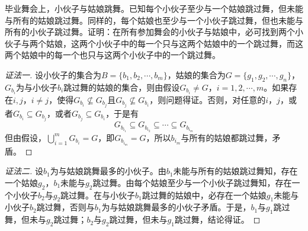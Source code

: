 \documentclass{article}
\begin{document}
\begin{CJK}{UTF8}{gbsn}
\begin{Exercise}
  毕业舞会上，小伙子与姑娘跳舞。已知每个小伙子至少与一个姑娘跳过舞，但未能与所有的姑娘跳过舞。同样的，每个姑娘也至少与一个小伙子跳过舞，但也未能与所有的小伙子跳过舞。证明：在所有参加舞会的小伙子与姑娘中，必可找到两个小伙子与两个姑娘，这两个小伙子中的每一个只与这两个姑娘中的一个跳过舞，而这两个姑娘中的每一个也只与这两个小伙子中的一个跳过舞。
\end{Exercise}
\begin{proof}[证法一]设小伙子的集合为$B=\{b_1,b_2,\cdots,b_m\}$，姑娘的集合为$G=\{g_1,g_2,\cdots,g_n\}$， $G_{b_i}$为与小伙子$b_i$跳过舞的姑娘的集合，则由假设$G_{b_i}\neq G$，$i=1,2,\cdots,m$。如果存在$i, j$，$i \neq j$，使得$G_{b_i}\nsubseteq G_{b_j}$且$G_{b_j}\nsubseteq G_{b_i}$，则问题得证。否则，对任意的$i$，$j$，或者$G_{b_i}\subseteq G_{b_j}$，或者$G_{b_j}\subseteq G_{b_i}$，于是有\[G_{b_{i_1}}\subseteq G_{b_{i_2}}\subseteq \cdots \subseteq G_{b_{i_m}}\]但由假设，$\bigcup_{i=1}^mG_{b_i} = G$，即$G_{b_{i_m}}=G$，所以$b_{i_m}$与所有的姑娘都跳过舞，矛盾。
  
\end{proof}
\begin{proof}[证法二]设$b_1$为与姑娘跳舞最多的小伙子。由$b_1$未能与所有的姑娘跳过舞知，存在一个姑娘$g_2$，$b_1$未能与$g_2$跳过舞。由每个姑娘至少与一个小伙子跳过舞知，存在一个小伙子$b_2$与$g_2$跳过舞。在与小伙子$b_1$跳过舞的姑娘中，必存在一个姑娘$g_1$未能与小伙子$b_2$跳过舞，否则与$b_1$为与姑娘跳舞最多的小伙子矛盾。于是，$b_1$与$g_1$跳过舞，但未与$g_2$跳过舞；$b_2$与$g_2$跳过舞，但未与$g_1$跳过舞，结论得证。  
\end{proof}

\end{CJK}
\end{document}
